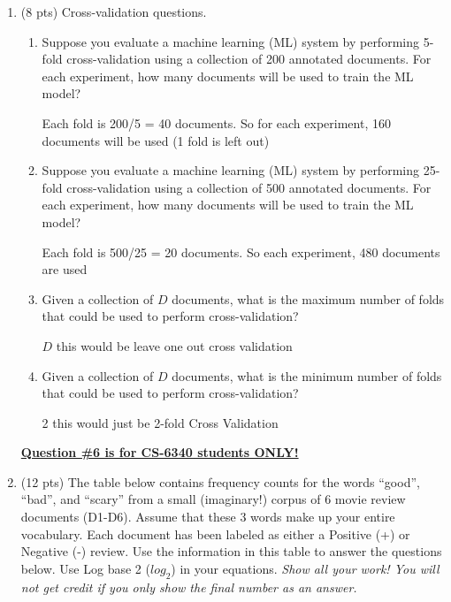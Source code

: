 \documentclass[11pt]{article}
\begin{document}
\begin{enumerate}
\item (8 pts) Cross-validation questions.

\begin{enumerate}

\item Suppose you evaluate a machine learning (ML) system by
  performing 5-fold cross-validation using a collection of 200
  annotated documents. For each experiment, how many documents will be
  used to train the ML model?
  
  Each fold is 200/5 = 40 documents. So for each experiment, 160 documents will be used (1 fold is left out)

\item Suppose you evaluate a machine learning (ML) system by
  performing 25-fold cross-validation using a collection of 500
  annotated documents. For each experiment, how many documents will be
  used to train the ML model?
  
  Each fold is 500/25 = 20 documents. So each experiment, 480 documents are used

\item Given a collection of $D$ documents, what is the maximum number of
  folds that could be used to perform cross-validation?
  
  $D$ this would be leave one out cross validation

\item Given a collection of $D$ documents, what is the minimum number of
  folds that could be used to perform cross-validation? 
  
  2 this would just be 2-fold Cross Validation

\end{enumerate}


\newpage

\underline{\textbf{Question \#6 is for CS-6340 students ONLY!}}  \\

\item (12 pts) The table below contains frequency counts for the
  words ``good'', ``bad'', and ``scary'' from a small (imaginary!)
  corpus of 6 movie review documents (D1-D6).  Assume that these 3
  words make up your entire vocabulary. Each document has been labeled as
 either a Positive (+) or Negative (-) review. Use the information in this table
  to answer the questions below. Use Log base 2 ($log_2$) in your
  equations.  {\it Show all your work! You will not
  get credit if you only show the final number as an answer.}


\end{enumerate}
\end{document}
